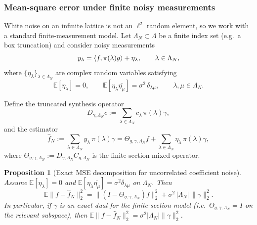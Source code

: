 \documentclass[final,1p,times,authoryear]{elsarticle}
\newtheorem{proposition}[theorem]{Proposition}
\theoremstyle{definition}
\newcommand{\E}{\mathbb{E}}
\newcommand{\1}{\mathbf{1}}
\DeclarePairedDelimiter{\inner}{\langle}{\rangle}
\begin{document}
\subsubsection{Mean-square error under finite noisy measurements}
White noise on an infinite lattice is not an $\ell^2$ random element, so we work with a standard
finite-measurement model.
Let $\Lambda_N\subset\Lambda$ be a finite index set (e.g.\ a box truncation) and consider noisy
measurements
$$
y_\lambda=\inner{f,\pi(\lambda)g}+\eta_\lambda,\qquad \lambda\in\Lambda_N,
$$
where $\{\eta_\lambda\}_{\lambda\in\Lambda_N}$ are complex random variables satisfying
$$
\E[\eta_\lambda]=0,
\qquad
\E[\eta_\lambda\overline{\eta_\mu}]
=
\sigma^2\,\delta_{\lambda\mu},
\qquad \lambda,\mu\in\Lambda_N.
$$


Define the truncated synthesis operator
$$
D_{\gamma,\Lambda_N}c := \sum_{\lambda\in\Lambda_N} c_\lambda\,\pi(\lambda)\gamma,
$$
and the estimator
$$
\widehat f_N:=\sum_{\lambda\in\Lambda_N} y_\lambda\,\pi(\lambda)\gamma
=
\Theta_{g,\gamma,\Lambda_N}f + \sum_{\lambda\in\Lambda_N}\eta_\lambda\,\pi(\lambda)\gamma,
$$
where $\Theta_{g,\gamma,\Lambda_N}:=D_{\gamma,\Lambda_N}C_{g,\Lambda_N}$ is the finite-section mixed operator.

\begin{proposition}[Exact MSE decomposition for uncorrelated coefficient noise]\label{prop:mse_finite}
Assume $\E[\eta_\lambda]=0$ and $\E[\eta_\lambda\overline{\eta_\mu}]=\sigma^2\delta_{\lambda\mu}$ on $\Lambda_N$.
Then
\begin{equation}\label{eq:mse_decomposition}
\E\|f-\widehat f_N\|_2^2
=
\|(I-\Theta_{g,\gamma,\Lambda_N})f\|_2^2
+
\sigma^2\,|\Lambda_N|\,\|\gamma\|_2^2.
\end{equation}
In particular, if $\gamma$ is an exact dual for the finite-section model (i.e.\ $\Theta_{g,\gamma,\Lambda_N}=I$ on the relevant subspace),
then $\E\|f-\widehat f_N\|_2^2=\sigma^2|\Lambda_N|\|\gamma\|_2^2$.
\end{proposition}
\end{document}
